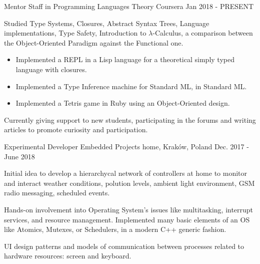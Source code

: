 
\begin{cventries}

\cventry
    {Mentor Staff in \href{https://www.coursera.org/learn/programming-languages}{}}
    {Programming Languages Theory}
    {Coursera}
    {Jan 2018 - PRESENT}
    {
        \begin{cvitems} %
            \item {Studied Type Systems, Closures, Abstract Syntax Trees, Language implementations, Type Safety, Introduction to $\lambda$-Calculus, a comparison between the Object-Oriented Paradigm against the Functional one.}
            \begin{itemize}
                \item {Implemented a REPL in a Lisp language for a theoretical simply typed language with closures.}
                \item {Implemented a Type Inference machine for Standard ML, in Standard ML.}
                \item {Implemented a Tetris game in Ruby using an Object-Oriented design.}
            \end{itemize}
            \item {Currently giving support to new students, participating in the forums and writing articles to promote curiosity and participation.}
        \end{cvitems}
    }

\cventry
    {Experimental Developer}
    {Embedded Projects}
    {home, Kraków, Poland}
    {Dec. 2017 - June 2018}
    {
        \begin{cvitems} %
            \item {Initial idea to develop a hierarchycal network of controllers at home to monitor and interact weather conditions, polution levels, ambient light environment, GSM radio messaging, scheduled events.}
            \item {Hands-on involvement into Operating System's issues like multitasking, interrupt services, and resource management. Implemented many basic elements of an OS like Atomics, Mutexes, or Schedulers, in a modern C++ generic fashion.}
            \item {UI design patterns and models of communication between processes related to hardware resources: screen and keyboard.}
        \end{cvitems}
    }


\end{cventries}
